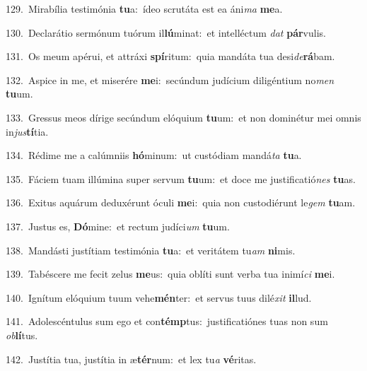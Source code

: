 {\numbfont\textcolor{\numbcolor}{129.}}~Mirabília testimónia \textbf{tu}\-a:~\star ídeo scrutáta est ea áni\textit{ma} \textbf{me}\-a.\par
{\numbfont\textcolor{\numbcolor}{130.}}~Declarátio sermónum tuórum il\-\textbf{lú}\-minat:~\star et intelléctum \textit{dat} \textbf{pár}\-vulis.\par
{\numbfont\textcolor{\numbcolor}{131.}}~Os meum apérui, et attráxi \textbf{spí}\-ritum:~\star quia mandáta tua desi\-\textit{de}\-\textbf{rá}bam.\par
{\numbfont\textcolor{\numbcolor}{132.}}~Aspice in me, et miserére \textbf{me}\-i:~\star secúndum judícium diligéntium no\textit{men} \textbf{tu}\-um.\par
{\numbfont\textcolor{\numbcolor}{133.}}~Gressus meos dírige secúndum elóquium \textbf{tu}\-um:~\star et non dominétur mei omnis in\-\textit{jus}\-\textbf{tí}tia.\par
{\numbfont\textcolor{\numbcolor}{134.}}~Rédime me a calúmniis \textbf{hó}\-minum:~\star ut custódiam mandá\textit{ta} \textbf{tu}\-a.\par
{\numbfont\textcolor{\numbcolor}{135.}}~Fáciem tuam illúmina super servum \textbf{tu}\-um:~\star et doce me justificatió\textit{nes} \textbf{tu}\-as.\par
{\numbfont\textcolor{\numbcolor}{136.}}~Exitus aquárum deduxérunt óculi \textbf{me}\-i:~\star quia non custodiérunt le\textit{gem} \textbf{tu}\-am.\par
{\numbfont\textcolor{\numbcolor}{137.}}~Justus es, \textbf{Dó}\-mine:~\star et rectum judíci\textit{um} \textbf{tu}\-um.\par
{\numbfont\textcolor{\numbcolor}{138.}}~Mandásti justítiam testimónia \textbf{tu}\-a:~\star et veritátem tu\textit{am} \textbf{ni}\-mis.\par
{\numbfont\textcolor{\numbcolor}{139.}}~Tabéscere me fecit zelus \textbf{me}\-us:~\star quia oblíti sunt verba tua inimí\textit{ci} \textbf{me}\-i.\par
{\numbfont\textcolor{\numbcolor}{140.}}~Ignítum elóquium tuum vehe\-\textbf{mén}\-ter:~\star et servus tuus dilé\textit{xit} \textbf{il}\-lud.\par
{\numbfont\textcolor{\numbcolor}{141.}}~Adolescéntulus sum ego et con\-\textbf{témp}\-tus:~\star justificatiónes tuas non sum \textit{ob}\-\textbf{lí}tus.\par
{\numbfont\textcolor{\numbcolor}{142.}}~Justítia tua, justítia in æ\-\textbf{tér}\-num:~\star et lex tu\textit{a} \textbf{vé}\-ritas.\par

